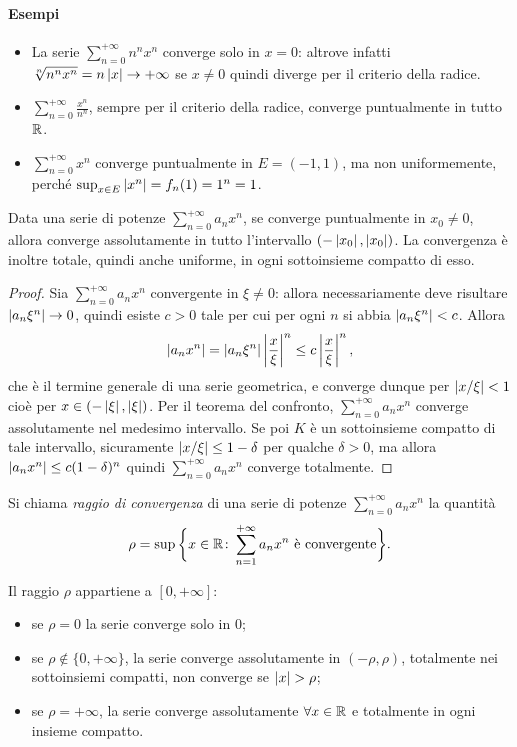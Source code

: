 \paragraph{Esempi}
\begin{itemize}
\item La serie $\sum_{n=0}^{+\infty}n^nx^n$ converge solo in $x=0$: altrove infatti $\sqrt[n]{n^nx^n}=n\left|{x}\right|\to+\infty$ se $x\neq 0$ quindi diverge per il criterio della radice.
\item $\sum_{n=0}^{+\infty}\frac{x^n}{n^n}$, sempre per il criterio della radice, converge puntualmente in tutto $\mathbb{R}$.
\item $\sum_{n=0}^{+\infty}x^n$ converge puntualmente in $E=(-1,1)$, ma non uniformemente, perché $\sup_{x\in E}\left|{x^n}\right|=f_n(1)=1^n=1$.
\end{itemize}
\begin{teorema}
Data una serie di potenze $\sum_{n=0}^{+\infty}a_nx^n$, se converge puntualmente in $x_0\neq 0$, allora converge assolutamente in tutto l'intervallo $(-\left|{x_0}\right|,\left|{x_0}\right|)$. La convergenza è inoltre totale, quindi anche uniforme, in ogni sottoinsieme compatto di esso.
\end{teorema}
\begin{proof}
Sia $\sum_{n=0}^{+\infty}a_nx^n$ convergente in $\xi\neq 0$: allora necessariamente deve risultare $\left|{a_n\xi^n}\right|\to 0$, quindi esiste $c>0$ tale per cui per ogni $n$ si abbia $\left|{a_n\xi^n}\right|<c$. Allora
\[
\left|{a_nx^n}\right|=\left|{a_n\xi^n}\right|\left|{\frac{x}{\xi}}\right|^n\leq c\left|{\frac{x}{\xi}}\right|^n,
\]
che è il termine generale di una serie geometrica, e converge dunque per $\left|{x/\xi}\right|<1$ cioè per $x\in(-\left|{\xi}\right|,\left|{\xi}\right|)$. Per il teorema del confronto, $\sum_{n=0}^{+\infty}a_nx^n$ converge assolutamente nel medesimo intervallo.
Se poi $K$ è un sottoinsieme compatto di tale intervallo, sicuramente $\left|{x/\xi}\right|\leq 1-\delta$ per qualche $\delta>0$, ma allora $\left|{a_nx^n}\right|\leq c(1-\delta)^n$ quindi $\sum_{n=0}^{+\infty}a_nx^n$ converge totalmente.
\end{proof}
\begin{definizione}
Si chiama \emph{raggio di convergenza} di una serie di potenze $\sum_{n=0}^{+\infty}a_nx^n$ la quantità
\[
\rho=\sup\bigg\{x\in\mathbb{R}\colon\sum_{n=1}^{+\infty}a_nx^n\text{ è convergente}\bigg\}.
\]
\end{definizione}
Il raggio $\rho$ appartiene a $[0,+\infty]$:
\begin{itemize}
\item se $\rho=0$ la serie converge solo in 0;
\item se $\rho\notin\{0,+\infty\}$, la serie converge assolutamente in $(-\rho,\rho)$, totalmente nei sottoinsiemi compatti, non converge se $\abs{x}>\rho$;
\item se $\rho=+\infty$, la serie converge assolutamente $\forall x\in\mathbb{R}$ e totalmente in ogni insieme compatto.
\end{itemize}

